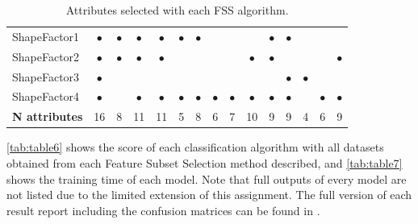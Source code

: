 \documentclass[a4paper,11pt]{article}
\begin{document}
\begin{table}[h]
\begin{tabular}{||l|c|c|c|c|c|c|c|c|c|c|c|c|c|c||}
    ShapeFactor1 & $\bullet$ & $\bullet$ & $\bullet$ & $\bullet$ & $\bullet$ & $\bullet$ & & & & $\bullet$ & $\bullet$ & & & \\
    ShapeFactor2 & $\bullet$ & $\bullet$ & $\bullet$ & $\bullet$ & & & & & $\bullet$ & $\bullet$ & & & & $\bullet$\\
    ShapeFactor3 & $\bullet$ & & & & & & & & & & $\bullet$ & $\bullet$ & & \\
	ShapeFactor4 & $\bullet$ & & $\bullet$ & $\bullet$ & $\bullet$ & $\bullet$ & $\bullet$ & $\bullet$ & $\bullet$ & $\bullet$ & $\bullet$ & & $\bullet$ & $\bullet$\\
    \hline
    \textbf{N attributes} & 16 & 8 & 11 & 11 & 5 & 8 & 6 & 7 & 10 & 9 & 9 & 4 & 6 & 9\\
    \hline
\end{tabular}
\caption{Attributes selected with each FSS algorithm.}
\label{tab:table5}
\end{table}


\autoref{tab:table6} shows the score of each classification algorithm with all datasets obtained from each Feature Subset Selection method described, and \autoref{tab:table7} shows the training time of each model. Note that full outputs of every model are not listed due to the limited extension of this assignment. The full version of each result report including the confusion matrices can be found in \cite{repo}.
\end{document}
